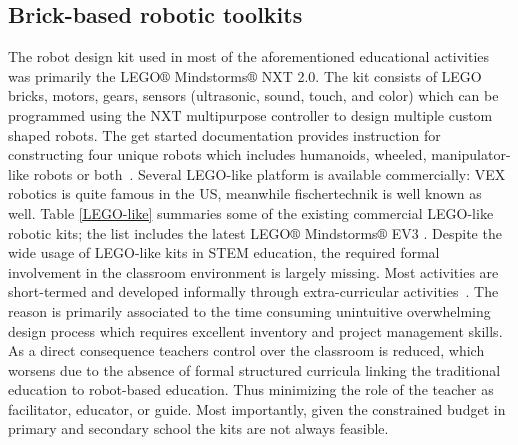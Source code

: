 \documentclass[conference]{IEEEtran}
\begin{document}
\subsection{Brick-based robotic toolkits}

The robot design kit used in most of the aforementioned educational activities was primarily the LEGO$\circledR$ 
Mindstorms$\circledR$ NXT 2.0. The kit consists of LEGO bricks, motors, gears, sensors (ultrasonic, sound, touch, and 
color) which can be programmed using the NXT multipurpose controller to design multiple custom shaped robots. The get 
started documentation provides instruction for constructing four unique robots which includes humanoids, wheeled, 
manipulator-like robots or both~\cite{LEGONXT}. Several LEGO-like platform is available commercially: VEX robotics is 
quite famous in the US, meanwhile fischertechnik is well known as well. Table \ref{LEGO-like} summaries some of the 
existing commercial LEGO-like robotic kits; the list includes the latest LEGO$\circledR$ Mindstorms$\circledR$ EV3 
\cite{LEGOEV3}. Despite the wide usage of LEGO-like kits in STEM education, the required formal involvement in the 
classroom environment is largely missing. Most activities are short-termed and developed informally through 
extra-curricular activities~\cite{mubin2013review}. The reason is primarily associated to the time consuming unintuitive 
overwhelming design process which requires excellent inventory and project management skills. As a direct consequence 
teachers control over the classroom is reduced, which worsens due to the absence of formal structured curricula linking 
the traditional education to robot-based education. Thus minimizing the role of the teacher as facilitator, educator, 
or guide. Most importantly, given the constrained budget in primary and secondary school the kits are not always 
feasible. 
\end{document}

